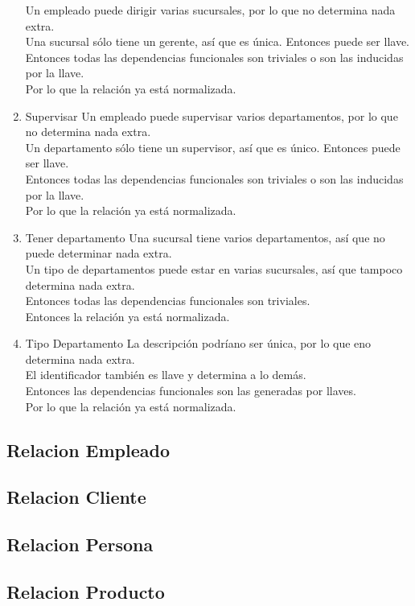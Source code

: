 \documentclass[10pt]{article}
\begin{document}
\begin{enumerate}
	Un empleado puede dirigir varias sucursales, por lo que no determina nada
	extra.\\
	Una sucursal sólo tiene un gerente, así que es única. Entonces puede ser
	llave.\\
	Entonces todas las dependencias funcionales son triviales o son las
	inducidas por la llave.\\
	Por lo que la relación ya está normalizada.
	\item Supervisar
	Un empleado puede supervisar varios departamentos, por lo que no determina nada
	extra.\\
	Un departamento sólo tiene un supervisor, así que es único. Entonces puede ser
	llave.\\
	Entonces todas las dependencias funcionales son triviales o son las
	inducidas por la llave.\\
	Por lo que la relación ya está normalizada.
	\item Tener departamento
	Una sucursal tiene varios departamentos, así que no puede determinar nada
	extra.\\
	Un tipo de departamentos puede estar en varias sucursales, así que tampoco
	determina nada extra.\\
	Entonces todas las dependencias funcionales son triviales.\\
	Entonces la relación ya está normalizada.
	\item Tipo Departamento
	La descripción podríano ser única, por lo que eno determina nada extra.\\
	El identificador también es llave y determina a lo demás.\\
	Entonces las dependencias funcionales son las generadas por llaves. \\
	Por lo que la relación ya está normalizada.
\end{enumerate}

\subsection{Relacion Empleado}
\subsection{Relacion Cliente}
\subsection{Relacion Persona}

\subsection{Relacion Producto}
\end{document}
